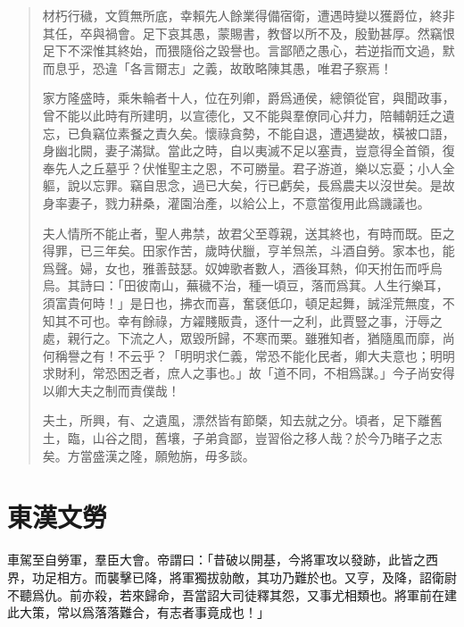 \begin{quotation}
材朽行穢，文質無所底，幸賴先人餘業得備宿衛，遭遇時變以獲爵位，終非其任，卒與禍會。足下哀其愚，蒙賜書，教督以所不及，殷勤甚厚。然竊恨足下不深惟其終始，而猥隨俗之毀譽也。言鄙陋之愚心，若逆指而文過，默而息乎，恐違「各言爾志」之義，故敢略陳其愚，唯君子察焉！

家方隆盛時，乘朱輪者十人，位在列卿，爵爲通侯，總領從官，與聞政事，曾不能以此時有所建明，以宣德化，又不能與羣僚同心幷力，陪輔朝廷之遺忘，已負竊位素餐之責久矣。懷祿貪勢，不能自退，遭遇變故，橫被口語，身幽北闕，妻子滿獄。當此之時，自以夷滅不足以塞責，豈意得全首領，復奉先人之丘墓乎？伏惟聖主之恩，不可勝量。君子游道，樂以忘憂；小人全軀，說以忘罪。竊自思念，過已大矣，行已虧矣，長爲農夫以沒世矣。是故身率妻子，戮力耕桑，灌園治產，以給公上，不意當復用此爲譏議也。

夫人情所不能止者，聖人弗禁，故君父至尊親，送其終也，有時而既。臣之得罪，已三年矣。田家作苦，歲時伏臘，亨羊炰羔，斗酒自勞。家本也，能爲聲。婦，女也，雅善鼓瑟。奴婢歌者數人，酒後耳熱，仰天拊缶而呼烏烏。其詩曰：「田彼南山，蕪穢不治，種一頃豆，落而爲萁。人生行樂耳，須富貴何時！」是日也，拂衣而喜，奮褎低卬，頓足起舞，誠淫荒無度，不知其不可也。幸有餘祿，方糴賤販貴，逐什一之利，此賈豎之事，汙辱之處，親行之。下流之人，眾毀所歸，不寒而栗。雖雅知者，猶隨風而靡，尚何稱譽之有！不云乎？「明明求仁義，常恐不能化民者，卿大夫意也；明明求財利，常恐困乏者，庶人之事也。」故「道不同，不相爲謀。」今子尚安得以卿大夫之制而責僕哉！

夫土，所興，有、之遺風，漂然皆有節槩，知去就之分。頃者，足下離舊土，臨，山谷之間，舊壤，子弟貪鄙，豈習俗之移人哉？於今乃睹子之志矣。方當盛漢之隆，願勉旃，毋多談。
\end{quotation}
\vspace{-1em}
\theendnotes

\section[光武帝臨淄勞耿弇\quad{\small 東漢文}]{{\normalsize 東漢文}\quad {}勞}
車駕至自勞軍，羣臣大會。帝謂曰：「昔破以開基，今將軍攻以發跡，此皆之西界，功足相方。而襲擊已降，將軍獨拔勍敵，其功乃難於也。又亨，及降，詔衛尉不聽爲仇。前亦殺，若來歸命，吾當詔大司徒釋其怨，又事尤相類也。將軍前在建此大策，常以爲落落難合，有志者事竟成也！」

